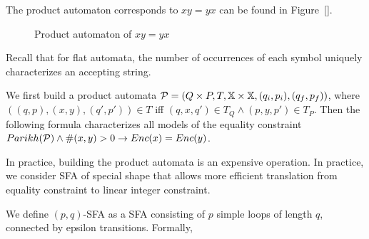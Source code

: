 \documentclass{llncs}
\begin{document}
The product automaton corresponds to $xy=yx$ can be found in Figure~\ref{}. 

\begin{figure}

	\begin{minipage}[t]{0.28\textwidth}
	\end{minipage}
	
	\caption{Product automaton of $xy=yx$}
	\label{fig:sfa}
\end{figure}




Recall that for flat automata, the number of occurrences of each symbol uniquely characterizes an accepting string. 






We first build a product automata $\mathcal{P}=(Q\times P, T, \mbox{$\mathbb{X}$}\times \mbox{$\mathbb{X}$}, (q_i,p_i), (q_f,p_f))$, where $((q,p),(x,y), (q',p'))\in T$ iff $(q,x,q')\in T_Q \wedge (p,y,p')\in T_P$. Then the following formula characterizes all models of the equality constraint $Parikh(\mathcal{P}) \wedge \#(x,y) > 0 \rightarrow Enc(x) = Enc(y)$.

In practice, building the product automata is an expensive operation. In practice, we consider SFA of special shape that allows more efficient translation from equality constraint to linear integer constraint.

We define $(p,q)$-SFA as a SFA consisting of $p$ simple loops of length $q$, connected by epsilon transitions. Formally, 

\end{document}
